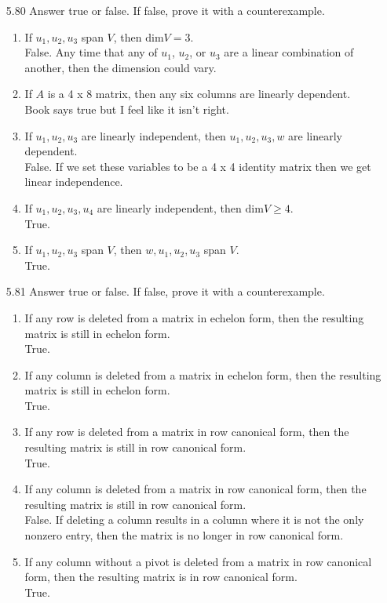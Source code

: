 \documentclass[12pt]{article}
\begin{document}
\begin{enumerate}
\item[5.80] Answer true or false. If false, prove it with a counterexample.
	\begin{enumerate}
	\item If $u_1,u_2,u_3$ span $V$, then $\mathrm{dim}V = 3$.\\
	False. Any time that any of $u_1$, $u_2$, or $u_3$ are a linear combination of another, then the dimension could vary.
	\item If $A$ is a 4 x 8 matrix, then any six columns are linearly dependent.\\
	Book says true but I feel like it isn't right.
	\item If $u_1,u_2,u_3$ are linearly independent, then $u_1,u_2,u_3,w$ are linearly dependent.\\
	False. If we set these variables to be a 4 x 4 identity matrix then we get linear independence.
	\item If $u_1,u_2,u_3,u_4$ are linearly independent, then $\mathrm{dim}V \geq 4$.\\
	True.
	\item If $u_1,u_2,u_3$ span $V$, then $w,u_1,u_2,u_3$ span $V$.\\
	True.
	\end{enumerate}

\item[5.81] Answer true or false. If false, prove it with a counterexample.
	\begin{enumerate}
	\item If any row is deleted from a matrix in echelon form, then the resulting matrix is still in echelon form.\\
	True.
	\item If any column is deleted from a matrix in echelon form, then the resulting matrix is still in echelon form.\\
	True.
	\item If any row is deleted from a matrix in row canonical form, then the resulting matrix is still in row canonical form.\\
	True.
	\item If any column is deleted from a matrix in row canonical form, then the resulting matrix is still in row canonical form.\\
	False. If deleting a column results in a column where it is not the only nonzero entry, then the matrix is no longer in row canonical form.
	\item If any column without a pivot is deleted from a matrix in row canonical form, then the resulting matrix is in row canonical form.\\
	True.
	\end{enumerate}


\end{enumerate}
\end{document}
